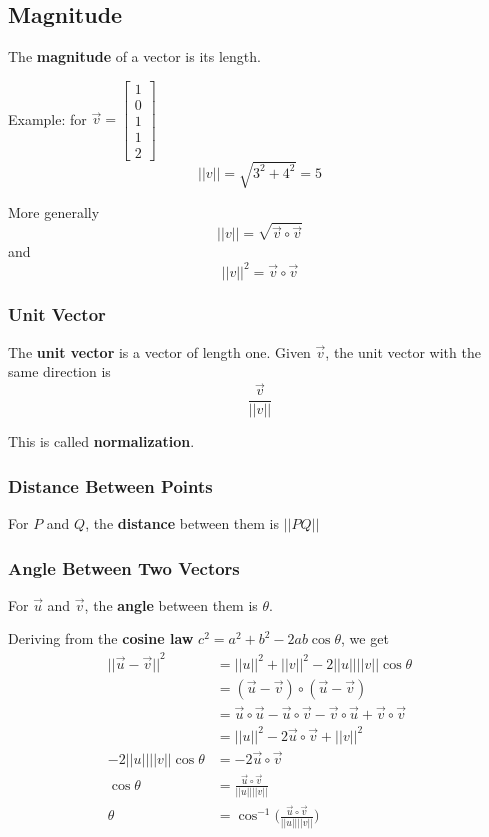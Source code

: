 \documentclass[12pt]{article}
\begin{document}
\subsection*{Magnitude}
The {\bf magnitude} of a vector is its length.

Example: for $\vec{v} = \begin{bmatrix}1\\0\\1\\1\\2\end{bmatrix}$ \[ {||v||} = \sqrt{3^2+4^2} = 5 \]

More generally \[ {||v||} = \sqrt{\vec{v}\circ\vec{v}} \] and \[ {||v||}^2 = \vec{v}\circ\vec{v} \]

\subsubsection*{Unit Vector}
The {\bf unit vector} is a vector of length one. Given $\vec{v}$, the unit vector with the same direction is \[ \frac{\vec{v}}{{||v||}} \]

This is called {\bf normalization}.

\subsubsection*{Distance Between Points}
For $P$ and $Q$, the {\bf distance} between them is $||PQ||$

\subsubsection*{Angle Between Two Vectors}
For $\vec{u}$ and $\vec{v}$, the {\bf angle} between them is $\theta$.

Deriving from the {\bf cosine law} $c^2 = a^2 + b^2 - 2ab\cos\theta$, we get
\begin{align*}
{||\vec{u}-\vec{v}||}^2 &= {||u||}^2 + {||v||}^2 - 2{||u||}{||v||}\cos\theta\\
&= (\vec{u}-\vec{v})\circ(\vec{u}-\vec{v})\\
&= \vec{u}\circ\vec{u} - \vec{u}\circ\vec{v} - \vec{v}\circ\vec{u} + \vec{v}\circ\vec{v}\\
&= {||u||}^2 - 2\vec{u}\circ\vec{v} + {||v||}^2\\
-2{||u||}{||v||}\cos\theta &= -2\vec{u}\circ\vec{v}\\
\cos{\theta}&=\frac{\vec{u}\circ\vec{v}}{{||u||}{||v||}}\\
\theta&=\cos^{-1}\bigg({\frac{\vec{u}\circ\vec{v}}{{||u||}{||v||}}}\bigg)
\end{align*}
\end{document}
